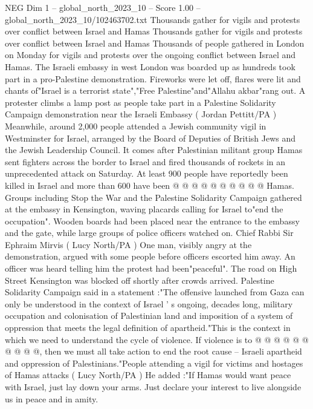 \begin{textsample}{NEG Dim 1 – global\_north\_2023\_10 – Score 1.00 – global\_north\_2023\_10/102463702.txt}  \label{ex:f1_neg_135}
Thousands gather for vigils and protests over conflict between Israel and Hamas Thousands gather for vigils and protests over conflict between Israel and Hamas Thousands of people gathered in London on Monday for vigils and protests over the ongoing conflict between Israel and Hamas.
The Israeli embassy in west London was boarded up as hundreds took part in a pro-Palestine demonstration.
Fireworks were let off, flares were lit and chants of"Israel is a terrorist state","Free Palestine"and"Allahu akbar"rang out.
A protester climbs a lamp post as people take part in a Palestine Solidarity Campaign demonstration near the Israeli Embassy ( Jordan Pettitt/PA ) Meanwhile, around 2,000 people attended a Jewish community vigil in Westminster for Israel, arranged by the Board of Deputies of British Jews and the Jewish Leadership Council.
It comes after Palestinian militant group Hamas sent fighters across the border to Israel and fired thousands of rockets in an unprecedented attack on Saturday.
At least 900 people have reportedly been killed in Israel and more than 600 have been @ @ @ @ @ @ @ @ @ @ Hamas.
Groups including Stop the War and the Palestine Solidarity Campaign gathered at the embassy in Kensington, waving placards calling for Israel to"end the occupation".
Wooden boards had been placed near the entrance to the embassy and the gate, while large groups of police officers watched on.
Chief Rabbi Sir Ephraim Mirvis ( Lucy North/PA ) One man, visibly angry at the demonstration, argued with some people before officers escorted him away.
An officer was heard telling him the protest had been"peaceful".
The road on High Street Kensington was blocked off shortly after crowds arrived.
Palestine Solidarity Campaign said in a statement :"The offensive launched from Gaza can only be understood in the context of Israel ' s ongoing, decades long, military occupation and colonisation of Palestinian land and imposition of a system of oppression that meets the legal definition of apartheid."This is the context in which we need to understand the cycle of violence.
If violence is to @ @ @ @ @ @ @ @ @ @, then we must all take action to end the root cause -- Israeli apartheid and oppression of Palestinians."People attending a vigil for victims and hostages of Hamas attacks ( Lucy North/PA ) He added :"If Hamas would want peace with Israel, just lay down your arms.
Just declare your interest to live alongside us in peace and in amity.

\end{textsample}
